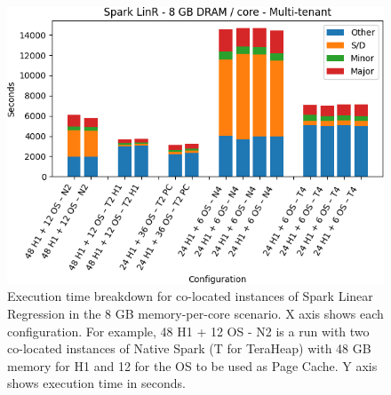 \begin{figure}[thbp]

    \includegraphics[width=\linewidth]{./fig/linr128.png}
    \caption{Execution time breakdown for co-located instances of Spark
    Linear Regression in the 8 GB memory-per-core scenario. X axis shows each configuration.
        For example, 48 H1 + 12 OS - N2 is a run with two co-located instances of Native Spark (T for TeraHeap) with 48 GB memory for H1 and 12 for the OS to be used as Page Cache. Y axis shows execution time in seconds.}
    \label{fig:linr128}
\end{figure}

